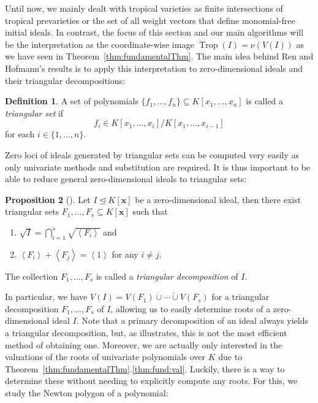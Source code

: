 \documentclass[
  paper=a4,
  titlepage,
  bibliography=totoc,
  pagesize=pdftex
]{scrartcl}
\numberwithin{figure}{section}
\numberwithin{equation}{section}
\numberwithin{table}{section}
\newcommand*\dotcup{\mathbin{\dot{\cup}}}
\newcommand*\ideal[1]{\left\langle #1 \right\rangle}
\let\vec\mathbf
\let\idealof\trianglelefteq
\DeclareMathOperator{\Trop}{Trop}
\theoremstyle{definition}
\newtheorem{definition}{Definition}
\newtheorem{proposition}[definition]{Proposition}
\numberwithin{definition}{section}
\begin{document}
Until now, we mainly dealt with tropical varieties as finite intersections of tropical
prevarieties or the set of all weight vectors that define monomial-free initial ideals. In
contrast, the focus of this section and our main algorithms will be the interpretation as
the coordinate-wise image $\Trop(I) = \nu(V(I))$ as we have seen in
Theorem~\ref{thm:fundamentalThm}. The main idea behind Ren and Hofmann's results is to
apply this interpretation to zero-dimensional ideals and their triangular decompositions:

\begin{definition}
  \label{def:triangSet}
  A set of polynomials $\{ f_1, \dots, f_n \} \subseteq K[x_1, \dots, x_n]$ is called a
  \emph{triangular set} if
  \[
    f_i \in K[x_1, \dots, x_i] / K[x_1, \dots, x_{i-1}]
  \]
  for each $i \in \{1, \dots, n\}$.
\end{definition}

Zero loci of ideals generated by triangular sets can be computed very easily as only
univariate methods and substitution are required. It is thus important to be able to
reduce general zero-dimensional ideals to triangular sets:

\begin{proposition}[{\cite[Corollary~4.7.4]{singIntro}}]
  Let $I \idealof K[\vec x]$ be a zero-dimensional ideal, then there exist triangular sets
  $F_1, \dots, F_s \subseteq K[\vec x]$ such that
  \begin{enumerate}
    \item $\sqrt I = \bigcap_{i=1}^s \sqrt{\ideal{F_i}}$ and
    \item $\ideal{F_i} + \ideal{F_j} = \ideal1$ for any $i\neq j$.
  \end{enumerate}
  The collection $F_1, \dots, F_s$ is called a \emph{triangular decomposition} of $I$.
  \label{prp:triang}
\end{proposition}

In particular, we have $V(I) = V(F_1) \dotcup \cdots \dotcup V(F_s)$ for a triangular
decomposition $F_1, \dots, F_s$ of $I$, allowing us to easily determine roots of a
zero-dimensional ideal $I$. Note that a primary decomposition of an ideal always yields a
triangular decomposition, but, as \cite[Lemma~4.7.5]{singIntro} illustrates, this is not
the most efficient method of obtaining one. Moreover, we are actually only interested in
the valuations of the roots of univariate polynomials over $K$ due to
Theorem~\ref{thm:fundamentalThm}.\ref{thm:fund:val}. Luckily, there is a way to determine
these without needing to explicitly compute any roots. For this, we study the Newton
polygon of a polynomial:
\end{document}
